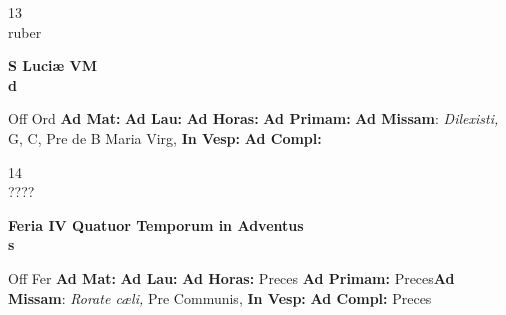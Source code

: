 \documentclass[10pt, openany]{book}
\begin{document}
    \begin{center}
        \begin{minipage}{3.5in}
            \vspace{2em}
            \begin{minipage}{0.5in}
                {\Huge 13} \\
                {\normalsize ruber}
            \end{minipage}
            \begin{minipage}{3.0in}
                \textbf{ \large S Luciæ VM \\
                \textnormal{\normalsize d}}

            \end{minipage}
            \begin{justify}Off Ord
                \textbf{Ad Mat: }
                \textbf{Ad Lau: }
                \textbf{Ad Horas: }
                \textbf{Ad Primam: }\textbf{Ad Missam}: \textit{Dilexisti,} G, C, Pre de B Maria Virg, 
                \textbf{In Vesp: }
                \textbf{Ad Compl: }
            \end{justify}
        \end{minipage}
    \end{center}

    \begin{center}
        \begin{minipage}{3.5in}
            \vspace{2em}
            \begin{minipage}{0.5in}
                {\Huge 14} \\
                {\normalsize ????}
            \end{minipage}
            \begin{minipage}{3.0in}
                \textbf{ \large Feria IV Quatuor Temporum in Adventus \\
                \textnormal{\normalsize s}}

            \end{minipage}
            \begin{justify}Off Fer
                \textbf{Ad Mat: }
                \textbf{Ad Lau: }
                \textbf{Ad Horas: }Preces
                \textbf{Ad Primam: }Preces\textbf{Ad Missam}: \textit{Rorate cæli,} Pre Communis, 
                \textbf{In Vesp: }
                \textbf{Ad Compl: }Preces
            \end{justify}
        \end{minipage}
    \end{center}
\end{document}
